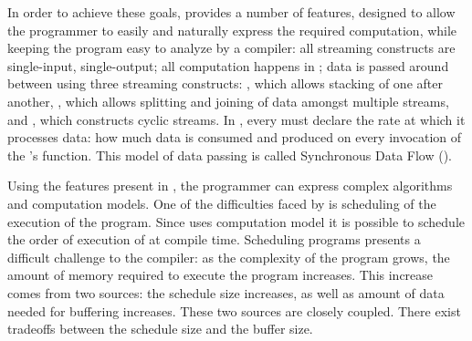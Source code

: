 In order to achieve these goals, {\StreamIt} provides a number of
features, designed to allow the programmer to easily and naturally
express the required computation, while keeping the program easy
to analyze by a compiler: all {\StreamIt} streaming constructs are
single-input, single-output; all computation happens in
{\filters}; data is passed around between {\filters} using three
streaming constructs: {\pipeline}, which allows stacking of
{\filters} one after another, {\splitjoin}, which allows splitting
and joining of data amongst multiple streams, and {{\feedbackloop}},
which constructs cyclic streams.  In {\StreamIt}, every {\filter}
must declare the rate at which it processes data: how much data is
consumed and produced on every invocation of the {\filter}'s
{\work} function.  This model of data passing is called
Synchronous Data Flow ({\SDF}).

\begin{comment}
In addition to {\SDF}, {\StreamIt} allows the programmer to pass
data between {\filters} in an asynchronous manner, similar to a
combination of message passing and function calls. Timing of such
data delivery is expressed in terms of amount of information
wavefronts - the programmer can specify a delay between message
delivery and destination {\filter}'s processing of data currently
being produced or consumed by the source {\filter}.  Such timing
mechanism introduces latency and buffering constraints on
execution of {\StreamIt} programs.
\end{comment}

Using the features present in {\StreamIt}, the programmer can
express complex algorithms and computation models.  One of the
difficulties faced by {\StreamIt} is scheduling of the execution
of the program.  Since {\StreamIt} uses {\SDF} computation model
it is possible to schedule the order of execution of {\filters} at
compile time.  Scheduling {\SDF} programs presents a difficult
challenge to the compiler:  as the complexity of the program
grows, the amount of memory required to execute the program
increases.  This increase comes from two sources: the schedule
size increases, as well as amount of data needed for buffering
increases.  These two sources are closely coupled. There exist
tradeoffs between the schedule size and the buffer size.

\begin{comment}
This problem is further complicated by message latency constraints
placed on the program by the programmer.  While {\StreamIt}
programs are meant to provide relatively lax latency requirements,
it is possible to write programs with latency constraints so tight
that very few valid schedules exist. Finding these schedules is a
challenging task.
\end{comment}

